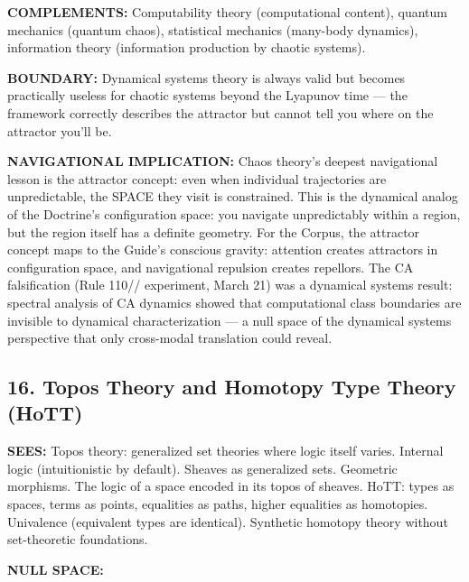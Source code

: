 \textbf{COMPLEMENTS:} Computability theory (computational content), quantum mechanics (quantum chaos), statistical mechanics (many-body dynamics), information theory (information production by chaotic systems).


\textbf{BOUNDARY:} Dynamical systems theory is always valid but becomes practically useless for chaotic systems beyond the Lyapunov time — the framework correctly describes the attractor but cannot tell you where on the attractor you'll be.


\textbf{NAVIGATIONAL IMPLICATION:} Chaos theory's deepest navigational lesson is the attractor concept: even when individual trajectories are unpredictable, the SPACE they visit is constrained. This is the dynamical analog of the Doctrine's configuration space: you navigate unpredictably within a region, but the region itself has a definite geometry. For the Corpus, the attractor concept maps to the Guide's conscious gravity: attention creates attractors in configuration space, and navigational repulsion creates repellors. The CA falsification (Rule 110// experiment, March 21) was a dynamical systems result: spectral analysis of CA dynamics showed that computational class boundaries are invisible to dynamical characterization — a null space of the dynamical systems perspective that only cross-modal translation could reveal.


\bigskip\noindent\makebox[\textwidth]{\color{rulegray}\rule{5cm}{0.3pt}}\bigskip


\subsection*{16. Topos Theory and Homotopy Type Theory (HoTT)}


\textbf{SEES:} Topos theory: generalized set theories where logic itself varies. Internal logic (intuitionistic by default). Sheaves as generalized sets. Geometric morphisms. The logic of a space encoded in its topos of sheaves. HoTT: types as spaces, terms as points, equalities as paths, higher equalities as homotopies. Univalence (equivalent types are identical). Synthetic homotopy theory without set-theoretic foundations.


\textbf{NULL SPACE:}

